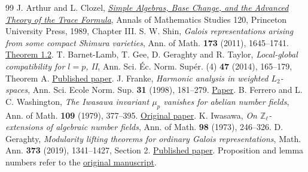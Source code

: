 \documentclass[a4paper,11pt]{article}
\theoremstyle{definition}
\theoremstyle{remark}
\newcommand{\ZZ}{\mathbb Z}\newcommand{\ord}{\operatorname{ord}}
\numberwithin{equation}{section}
\begin{document}
\begin{thebibliography}{99}
 J. Arthur and L. Clozel, \href{https://www.claymath.org/library/cw/arthur/pdf/30.pdf}{\emph{Simple Algebras, Base Change, and the Advanced Theory of the Trace Formula}}, Annals of Mathematics Studies 120, Princeton University Press, 1989, Chapter III.
 S. W. Shin, \emph{Galois representations arising from some compact Shimura varieties}, Ann. of Math. \textbf{173} (2011), 1645--1741. \href{https://annals.math.princeton.edu/2011/173-3/p09}{Theorem 1.2}.
 T. Barnet-Lamb, T. Gee, D. Geraghty and R. Taylor, \emph{Local-global compatibility for \(l=p\), II}, Ann. Sci. \'Ec. Norm. Sup\'er. (4) \textbf{47} (2014), 165--179, Theorem A. \href{https://www.numdam.org/articles/10.24033/asens.2212/}{Published paper}.
 J. Franke, \emph{Harmonic analysis in weighted \(L_2\)-spaces}, Ann. Sci. Ecole Norm. Sup. \textbf{31} (1998), 181--279. \href{https://www.numdam.org/articles/10.1016/s0012-9593(98)80015-3/}{Paper}.
 B. Ferrero and L. C. Washington, \emph{The Iwasawa invariant \(\mu_p\) vanishes for abelian number fields}, Ann. of Math. \textbf{109} (1979), 377--395. \href{https://doi.org/10.2307/1971116}{Original paper}.
 K. Iwasawa, \emph{On \(\ZZ_\ell\)-extensions of algebraic number fields}, Ann. of Math. \textbf{98} (1973), 246--326.
 D. Geraghty, \emph{Modularity lifting theorems for ordinary Galois representations}, Math. Ann. \textbf{373} (2019), 1341--1427, Section 2. \href{https://doi.org/10.1007/s00208-018-1742-4}{Published paper}. Proposition and lemma numbers refer to the \href{https://citeseerx.ist.psu.edu/document?doi=8faa2d675c94ae78d0ac8ebb3f9d4f69ede42d44\&repid=rep1\&type=pdf}{original manuscript}.
\end{thebibliography}\endgroup
\end{document}
